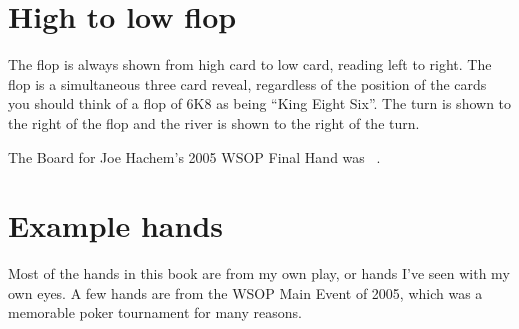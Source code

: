 
\section*{High to low flop}

The flop is always shown from high card to low card, reading left to
right. The flop is a simultaneous three card reveal, regardless of the
position of the cards you should think of a flop of 6K8 as being
``King Eight Six''. The turn is shown to the right of the flop and the
river is shown to the right of the turn.

The Board for Joe Hachem's 2005 WSOP Final Hand was
\sixh\fived\fourd\As\fourc\ .

\section*{Example hands}

Most of the hands in this book are from my own play, or hands I've
seen with my own eyes. A few hands are from the WSOP Main Event
of 2005, which was a memorable poker tournament for many reasons.

